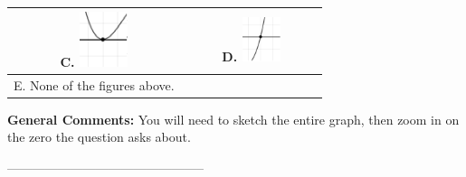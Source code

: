 \documentclass{article}[14pt]
\begin{document}
\begin{tabular}{|c|c|}
 \textbf{C.} \includegraphics[width=0.3\textwidth]{../Figures/zeroBehaviorPositiveEvenC.png} & \textbf{D.} \includegraphics[width=0.3\textwidth]{../Figures/zeroBehaviorPositiveOddC.png} \tabularnewline 
\hline 
 E. None of the figures above. & \tabularnewline 
\hline 
 \end{tabular} 
 
\textbf{General Comments:} You will need to sketch the entire graph, then zoom in on the zero the question asks about.

-----------------------------------------------
\end{document}
